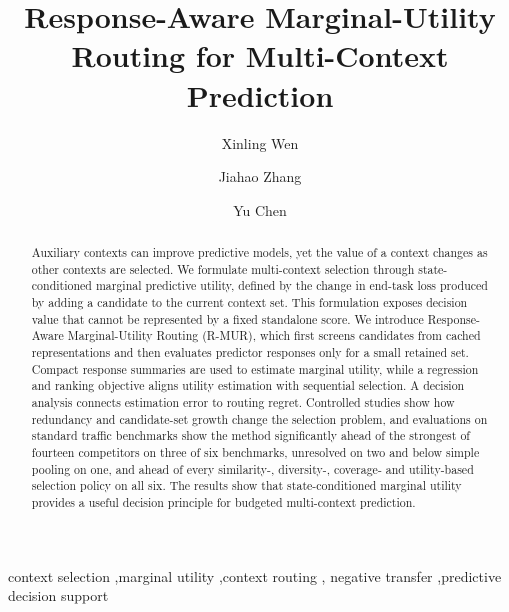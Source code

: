 \documentclass[\classoption,12pt]{elsarticle}
\theoremstyle{definition}
\begin{document}
\begin{frontmatter}
\title{Response-Aware Marginal-Utility Routing for Multi-Context Prediction}
\ifdefined\anonymousmode
\author{}
\else
\author[zua]{Xinling Wen}
\author[zua]{Jiahao Zhang}
\author[zua]{Yu Chen}
\fi
\begin{abstract}
Auxiliary contexts can improve predictive models, yet the value of a context
changes as other contexts are selected. We formulate multi-context selection
through state-conditioned marginal predictive utility, defined by the change in
end-task loss produced by adding a candidate to the current context set. This
formulation exposes decision value that cannot be represented by a fixed
standalone score. We introduce Response-Aware Marginal-Utility Routing
(R-MUR), which first screens candidates from cached representations and then
evaluates predictor responses only for a small retained set. Compact response
summaries are used to estimate marginal utility, while a regression and ranking
objective aligns utility estimation with sequential selection. A decision
analysis connects estimation error to routing regret. Controlled studies show
how redundancy and candidate-set growth change the selection problem, and
evaluations on standard traffic benchmarks show the method significantly ahead
of the strongest of fourteen competitors on three of six benchmarks,
unresolved on two and below simple pooling on one, and ahead of every similarity-, diversity-,
coverage- and utility-based selection policy on all six. The results show
that state-conditioned marginal utility provides a useful decision principle
for budgeted multi-context prediction.
\end{abstract}
\begin{keyword}
context selection \sep marginal utility \sep context routing \sep
negative transfer \sep predictive decision support
\end{keyword}
\end{frontmatter}
\end{document}
